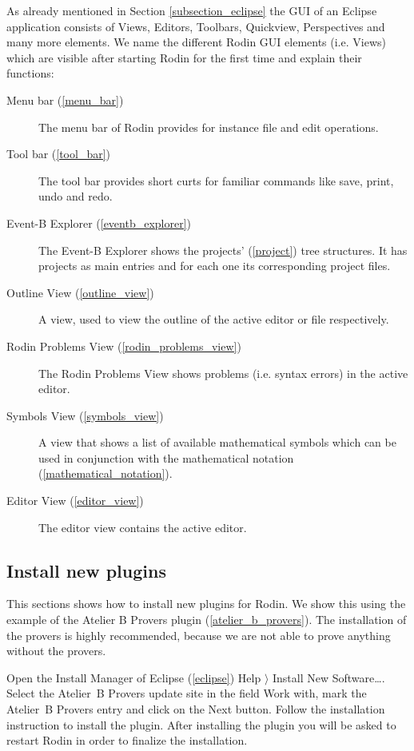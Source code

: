 As already mentioned in Section \ref{subsection_eclipse} the GUI of an Eclipse application consists of Views, Editors, Toolbars, Quickview, Perspectives and many more elements. We name the different Rodin GUI elements (i.e. Views) which are visible after starting Rodin for the first time and explain their functions:

\begin{description}
	\item[Menu bar (\ref{menu_bar})] The menu bar of Rodin provides for instance file and edit operations.
	\item[Tool bar (\ref{tool_bar})] The tool bar provides short curts for familiar commands like save, print, undo and redo.
	\item[Event-B Explorer (\ref{eventb_explorer})] The Event-B Explorer shows the projects' (\ref{project}) tree structures. It has projects as main entries and for each one its corresponding project files.
	\item[Outline View (\ref{outline_view})] A view, used to view the outline of the active editor or file respectively.
	\item[Rodin Problems View (\ref{rodin_problems_view})] The Rodin Problems View shows problems (i.e. syntax errors) in the active editor.
	\item[Symbols View (\ref{symbols_view})] A view that shows a list of available mathematical symbols which can be used in conjunction with the mathematical notation (\ref{mathematical_notation}).
	\item[Editor View (\ref{editor_view})] The editor view contains the active editor.
\end{description}

\subsection{Install new plugins}

This sections shows how to install new plugins for Rodin. We show this using the example of the Atelier B Provers plugin (\ref{atelier_b_provers}).
The installation of the provers is highly recommended, because we are not able to prove anything without the provers.

Open the Install Manager of Eclipse (\ref{eclipse}) \textsf{Help $\rangle$ Install New Software\ldots}. Select the Atelier~B Provers update site in the field \textsf{Work with}, mark the Atelier~B Provers entry and click on the \textsf{Next} button. Follow the installation instruction to install the plugin. After installing the plugin you will be asked to restart Rodin in order to finalize the installation.

